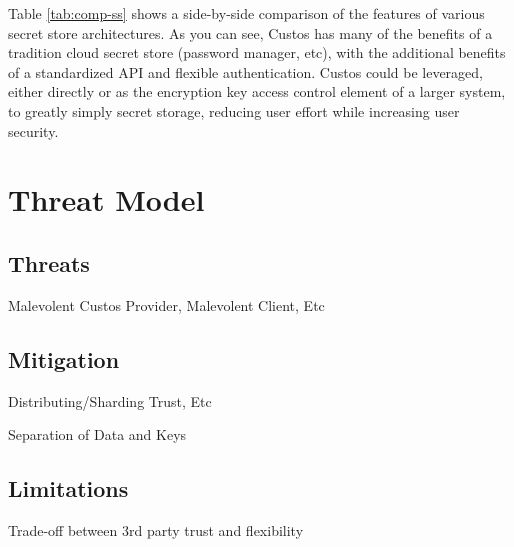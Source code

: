 Table \ref{tab:comp-ss} shows a side-by-side comparison of the
features of various secret store architectures. As you can see, Custos
has many of the benefits of a tradition cloud secret store (password
manager, etc), with the additional benefits of a standardized API and
flexible authentication. Custos could be leveraged, either directly or
as the encryption key access control element of a larger system, to
greatly simply secret storage, reducing user effort while increasing
user security.

\section{Threat Model}

\subsection{Threats}

Malevolent Custos Provider, Malevolent Client, Etc

\subsection{Mitigation}

Distributing/Sharding Trust, Etc

Separation of Data and Keys

\subsection{Limitations}

Trade-off between 3rd party trust and flexibility

